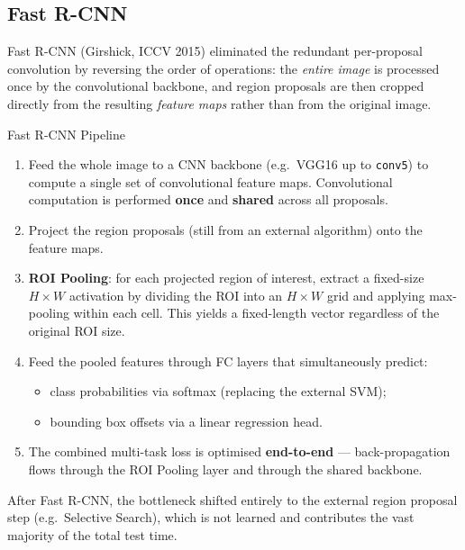 \documentclass[11pt,a4paper]{article}
\begin{document}
\subsection{Fast R-CNN}
\label{sec:fast_rcnn}

Fast R-CNN (Girshick, ICCV 2015) eliminated the redundant per-proposal convolution by reversing the order of operations: the \emph{entire image} is processed once by the convolutional backbone, and region proposals are then cropped directly from the resulting \emph{feature maps} rather than from the original image.

\begin{thmbox}{Fast R-CNN Pipeline}
\begin{enumerate}
  \item Feed the whole image to a CNN backbone (e.g.\ VGG16 up to \texttt{conv5}) to compute a single set of convolutional feature maps. Convolutional computation is performed \textbf{once} and \textbf{shared} across all proposals.
  \item Project the region proposals (still from an external algorithm) onto the feature maps.
  \item \textbf{ROI Pooling}: for each projected region of interest, extract a fixed-size $H \times W$ activation by dividing the ROI into an $H \times W$ grid and applying max-pooling within each cell. This yields a fixed-length vector regardless of the original ROI size.
  \item Feed the pooled features through FC layers that simultaneously predict:
    \begin{itemize}
      \item class probabilities via softmax (replacing the external SVM);
      \item bounding box offsets via a linear regression head.
    \end{itemize}
  \item The combined multi-task loss is optimised \textbf{end-to-end} — back-propagation flows through the ROI Pooling layer and through the shared backbone.
\end{enumerate}
\end{thmbox}

After Fast R-CNN, the bottleneck shifted entirely to the external region proposal step (e.g.\ Selective Search), which is not learned and contributes the vast majority of the total test time.
\end{document}
